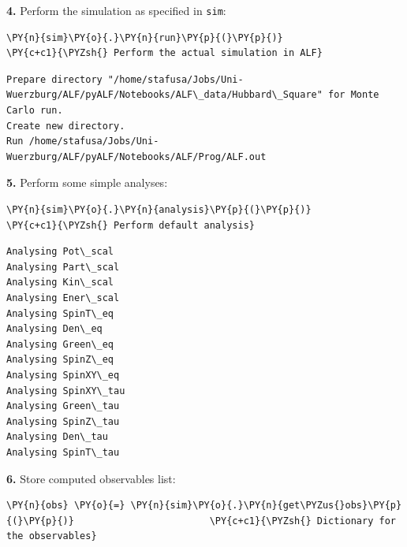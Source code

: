     \textbf{4.} Perform the simulation as specified in \texttt{sim}:

    \begin{tcolorbox}[breakable, size=fbox, boxrule=1pt, pad at break*=1mm,colback=cellbackground, colframe=cellborder]
\begin{Verbatim}[commandchars=\\\{\}]
\PY{n}{sim}\PY{o}{.}\PY{n}{run}\PY{p}{(}\PY{p}{)}                                  \PY{c+c1}{\PYZsh{} Perform the actual simulation in ALF}
\end{Verbatim}
\end{tcolorbox}

    \begin{Verbatim}[commandchars=\\\{\}]
Prepare directory "/home/stafusa/Jobs/Uni-
Wuerzburg/ALF/pyALF/Notebooks/ALF\_data/Hubbard\_Square" for Monte Carlo run.
Create new directory.
Run /home/stafusa/Jobs/Uni-Wuerzburg/ALF/pyALF/Notebooks/ALF/Prog/ALF.out
    \end{Verbatim}

    \textbf{5.} Perform some simple analyses:

    \begin{tcolorbox}[breakable, size=fbox, boxrule=1pt, pad at break*=1mm,colback=cellbackground, colframe=cellborder]
\begin{Verbatim}[commandchars=\\\{\}]
\PY{n}{sim}\PY{o}{.}\PY{n}{analysis}\PY{p}{(}\PY{p}{)}                             \PY{c+c1}{\PYZsh{} Perform default analysis}
\end{Verbatim}
\end{tcolorbox}

    \begin{Verbatim}[commandchars=\\\{\}]
Analysing Pot\_scal
Analysing Part\_scal
Analysing Kin\_scal
Analysing Ener\_scal
Analysing SpinT\_eq
Analysing Den\_eq
Analysing Green\_eq
Analysing SpinZ\_eq
Analysing SpinXY\_eq
Analysing SpinXY\_tau
Analysing Green\_tau
Analysing SpinZ\_tau
Analysing Den\_tau
Analysing SpinT\_tau
    \end{Verbatim}

    \textbf{6.} Store computed observables list:

    \begin{tcolorbox}[breakable, size=fbox, boxrule=1pt, pad at break*=1mm,colback=cellbackground, colframe=cellborder]
\begin{Verbatim}[commandchars=\\\{\}]
\PY{n}{obs} \PY{o}{=} \PY{n}{sim}\PY{o}{.}\PY{n}{get\PYZus{}obs}\PY{p}{(}\PY{p}{)}                        \PY{c+c1}{\PYZsh{} Dictionary for the observables}
\end{Verbatim}
\end{tcolorbox}

